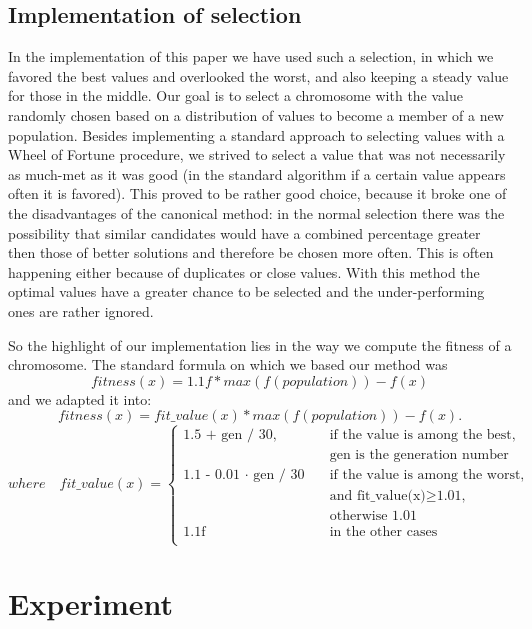 \documentclass{article}
\begin{document}
\subsection{Implementation of selection}
In the implementation of this paper we have used such a selection, in which we favored the best values and overlooked the worst, and also keeping a steady value for those in the middle. Our goal is to select a chromosome with the value randomly chosen based on a distribution of values to become a member of a new population. Besides implementing a standard approach to selecting values with a Wheel of Fortune procedure, we strived to select a value that was not necessarily as much-met as it was good (in the standard algorithm if a certain value appears often it is favored). This proved to be rather good choice, because it broke one of the disadvantages of the canonical method: in the normal selection there was the possibility that similar candidates would have a combined percentage greater then those of better solutions and therefore be chosen more often. This is often happening either because of duplicates or close values. With this method the optimal values have a greater chance to be selected and the under-performing ones are rather ignored. \\
\par So the highlight of our implementation lies in the way we compute the fitness of a chromosome. The standard formula on which we based our method was $$fitness(x) = 1.1f * max(f(population)) - f(x)$$ and we adapted it into: $$fitness(x) = fit\_value(x) * max(f(population)) - f(x).$$$$ where \quad fit\_value(x) =
\begin{cases}
   \text{1.5 + gen / 30,} &\quad\text{if the value is among the best,} \\
   \text{ } &\quad\text{gen is the generation number} \\
   \text{1.1 - 0.01 $\cdot$ gen / 30} &\quad\text{if the value is among the worst,}\\
   \text{ } &\quad\text{and fit\_value(x)}\ge\text{1.01,} \\
   \text{ } &\quad\text{otherwise 1.01} \\
   \text{1.1f} &\quad\text{in the other cases} \\
 \end{cases}$$

\section{Experiment}
\end{document}
